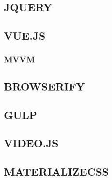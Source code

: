 \subsection{JQUERY}

\subsection{VUE.JS}

\subsubsection{MVVM}

\subsection{BROWSERIFY}

\subsection{GULP}

\subsection{VIDEO.JS}

\subsection{MATERIALIZECSS}